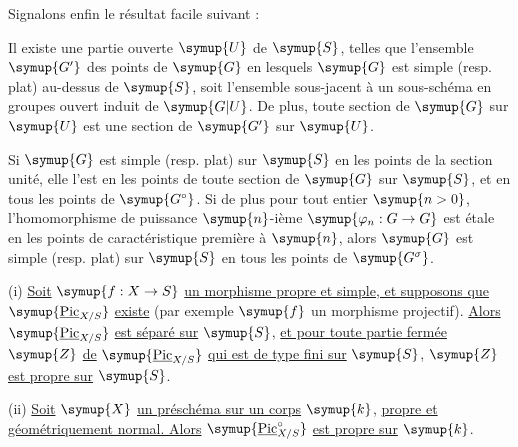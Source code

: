 Signalons enfin le résultat facile suivant :

 Il existe une partie ouverte $\symup{U}$ de $\symup{S}$, telles que
l'ensemble $\symup{G'}$ des points de $\symup{G}$ en lesquels $\symup{G}$ est simple (resp. plat)
au-dessus de $\symup{S}$, soit l'ensemble sous-jacent à un sous-schéma en groupes ouvert
induit de $\symup{G|U}$. De plus, toute section de $\symup{G}$ sur $\symup{U}$ est une section de $\symup{G'}$
sur $\symup{U}$.

 Si $\symup{G}$ est simple (resp. plat) sur $\symup{S}$ en les points
de la section unité, elle l'est en les points de toute section de $\symup{G}$ sur $\symup{S}$,
et en tous les points de $\symup{G^\circ}$. Si de plus pour tout entier $\symup{n>0}$,
l'homomorphisme de puissance $\symup{n}$-ième
$\symup{\varphi_n:G\to G}$ est étale en les points de caractéristique
première à $\symup{n}$, alors $\symup{G}$ est simple (resp. plat) sur $\symup{S}$ en tous les points de
$\symup{G^\sigma}$.



\noindent(i) \uline{Soit} $\symup{f:X\to S}$ \uline{un morphisme propre et simple, et
supposons que} $\symup{\underline{\operatorname{Pic}}_{X/S}}$ \uline{existe} (par exemple $\symup{f}$ un morphisme projectif). \uline{Alors} $\symup{\underline{\operatorname{Pic}}_{X/S}}$ \uline{est séparé sur} $\symup{S}$, \uline{et pour toute
partie fermée} $\symup{Z}$ \uline{de} $\symup{\underline{\operatorname{Pic}}_{X/S}}$ \uline{qui est de type fini sur} $\symup{S}$,
$\symup{Z}$ \uline{est propre sur} $\symup{S}$.

\noindent(ii) \uline{Soit} $\symup{X}$ \uline{un préschéma sur un corps} $\symup{k}$, \uline{propre et géométriquement
normal. Alors} $\symup{\underline{\operatorname{Pic}}_{X/S}^\circ}$ \uline{est propre sur} $\symup{k}$.


